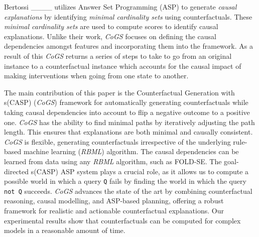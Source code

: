 Bertossi ____ utilizes Answer Set Programming (ASP) to generate \textit{causal explanations} by identifying \textit{minimal cardinality sets} using counterfactuals. These \textit{minimal cardinality sets} are used to compute scores to identify causal explanations. Unlike their work, \textit{CoGS} focuses on defining the causal dependencies amongst features and incorporating them into the framework. As a result of this \textit{CoGS} returns a series of steps to take to go from an original instance to a counterfactual instance which accounts for the causal impact of making interventions when going from one state to another.


The main contribution of this paper is the Counterfactual Generation with s(CASP) (\textit{CoGS}) framework for automatically generating counterfactuals while taking causal dependencies into account to flip a negative outcome to a positive one. \textit{CoGS} has the ability to find minimal paths by iteratively adjusting the path length.
This ensures that explanations are both minimal and causally consistent. \textit{CoGS} is flexible, generating counterfactuals irrespective of the underlying rule-based machine learning (\textit{RBML}) algorithm. The causal dependencies can be learned from data using any \textit{RBML} algorithm, such as FOLD-SE. The goal-directed s(CASP) ASP system plays a crucial role, as it allows us to compute a possible world in which a query {\tt Q} fails by finding the world in which the query {\tt not Q} succeeds. \textit{CoGS} advances the state of the art by combining counterfactual reasoning, causal modelling, and ASP-based planning, offering a robust framework for realistic and actionable counterfactual explanations. Our experimental results show that counterfactuals can be computed for complex models in a reasonable amount of time.